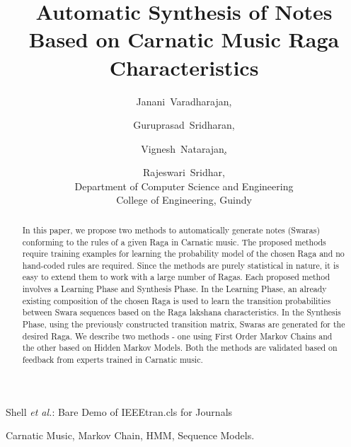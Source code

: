 \documentclass[journal]{IEEEtran}
\begin{document}
%
\title{Automatic Synthesis of Notes Based on Carnatic Music Raga Characteristics}

\author{Janani~Varadharajan\href{mailto:jananiva@outlook.com}, \and Guruprasad~Sridharan\href{mailto:guruprasad.sridharan@gmail.com}, \and Vignesh~Natarajan\href{mailto:vignesh.natarajan@gmail.com}, \and Rajeswari~Sridhar\href{mailto:raji.sridhar@gmail.com}, \\Department of Computer Science and Engineering
\\College of Engineering, Guindy}

\maketitle

%
{Shell \MakeLowercase{\textit{et al.}}: Bare Demo of IEEEtran.cls for Journals}

\begin{abstract}
In this paper, we propose two methods to automatically generate notes (Swaras) conforming to the rules of a given Raga in Carnatic music. The proposed methods require training examples for learning the probability model of the chosen Raga and no hand-coded rules are required. Since the methods are purely statistical in nature, it is easy to extend them to work with a large number of Ragas. Each proposed method involves a Learning Phase and Synthesis Phase. In the Learning Phase, an already existing composition of the chosen Raga is used to learn the transition probabilities between Swara sequences based on the Raga lakshana characteristics. In the Synthesis Phase, using the previously constructed transition matrix, Swaras are generated for the desired Raga. We describe two methods - one using First Order Markov Chains and the other based on Hidden Markov Models. Both the methods are validated based on feedback from experts trained in Carnatic music. 
\end{abstract}

\begin{IEEEkeywords}
Carnatic Music, Markov Chain, HMM, Sequence Models.
\end{IEEEkeywords}

\IEEEpeerreviewmaketitle
\end{document}
